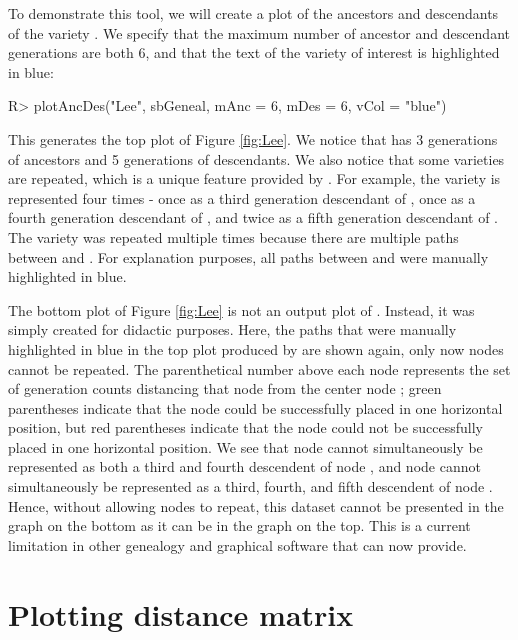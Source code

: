 \documentclass[article,shortnames]{jss}
\begin{document}
To demonstrate this tool, we will create a plot of the ancestors and descendants of the variety . We specify that the maximum number of ancestor and descendant generations are both 6, and that the text of the variety of interest is highlighted in blue:

\begin{Code}
R> plotAncDes("Lee", sbGeneal, mAnc = 6, mDes = 6, vCol = "blue")
\end{Code}

This generates the top plot of Figure \ref{fig:Lee}. We notice that  has 3 generations of ancestors and 5 generations of descendants. We also notice that some varieties are repeated, which is a unique feature provided by . For example, the variety  is represented four times - once as a third generation descendant of , once as a fourth generation descendant of , and twice as a fifth generation descendant of . The variety  was repeated multiple times because there are multiple paths between  and . For explanation purposes, all paths between  and  were manually highlighted in blue.

The bottom plot of Figure \ref{fig:Lee} is not an output plot of . Instead, it was simply created for didactic purposes. Here, the paths that were manually highlighted in blue in the top plot produced by  are shown again, only now nodes cannot be repeated. The parenthetical number above each node represents the set of generation counts distancing that node from the center node ; green parentheses indicate that the node could be successfully placed in one horizontal position, but red parentheses indicate that the node could not be successfully placed in one horizontal position. We see that node  cannot simultaneously be represented as both a third and fourth descendent of node , and node  cannot simultaneously be represented as a third, fourth, and fifth descendent of node . Hence, without allowing nodes to repeat, this dataset cannot be presented in the graph on the bottom as it can be in the  graph on the top. This is a current limitation in other genealogy and graphical software that  can now provide.

\section{Plotting distance matrix}
\label{pdm}
\end{document}
